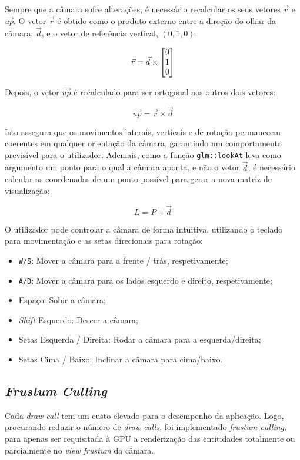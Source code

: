 \documentclass[12pt, a4paper]{article}
\begin{document}
Sempre que a câmara sofre alterações, é necessário recalcular os seus vetores $\vec{r}$ e
$\vec{up}$. O vetor $\vec{r}$ é obtido como o produto externo entre a direção do olhar da câmara,
$\vec{d}$, e o vetor de referência vertical, $(0,1,0)$:

$$
\def\arraystretch{1}
\vec{r} = \vec{d} \times
\begin{bmatrix}
    0 \\ 1 \\ 0
\end{bmatrix}
$$

Depois, o vetor $\vec{up}$ é recalculado para ser ortogonal aos outros dois vetores:

$$
\vec{up} = \vec{r} \times \vec{d}
$$

Isto assegura que os movimentos laterais, verticais e de rotação permanecem coerentes em
qualquer orientação da câmara, garantindo um comportamento previsível para o utilizador. Ademais,
como a função \texttt{glm::lookAt} leva como argumento um ponto para o qual a câmara aponta, e
não o vetor $\vec{d}$, é necessário calcular as coordenadas de um ponto possível para gerar a nova
matriz de visualização:

$$
L = P + \vec{d}
$$

O utilizador pode controlar a câmara de forma intuitiva, utilizando o teclado para movimentação
e as setas direcionais para rotação:

\begin{itemize}
    \item \texttt{W/S}: Mover a câmara para a frente / trás, respetivamente;
    \item \texttt{A/D}: Mover a câmara para os lados esquerdo e direito, respetivamente;
    \item Espaço: Sobir a câmara;
    \item \emph{Shift} Esquerdo: Descer a câmara;
    \item Setas Esquerda / Direita: Rodar a câmara para a esquerda/direita;
    \item Setas Cima / Baixo: Inclinar a câmara para cima/baixo.
\end{itemize}

\subsection{\emph{Frustum Culling}}

Cada \emph{draw call} tem um custo elevado para o desempenho da aplicação. Logo, procurando reduzir
o número de \emph{draw calls}, foi implementado \emph{frustum culling}, para apenas ser requisitada
à GPU a renderização das entitidades totalmente ou parcialmente no \emph{view frustum} da câmara.
\end{document}
